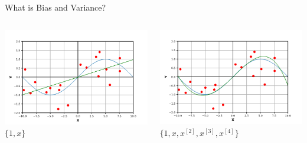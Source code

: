 \begin{frame}{What is Bias and Variance?}

\begin{columns}
    \begin{center}
        \includegraphics[width=0.95\linewidth]{images/linear-regression/linear-regression-14.png} \\
        $\{1, x\}$
    \end{center}
    
    \begin{center}
        \includegraphics[width=0.95\linewidth]{images/linear-regression/linear-regression-15.png} \\
        $\{1, x, x^{[2]}, x^{[3]}, x^{[4]}\}$
    \end{center}
\end{columns}

\vspace{0.2cm}


\end{frame}

